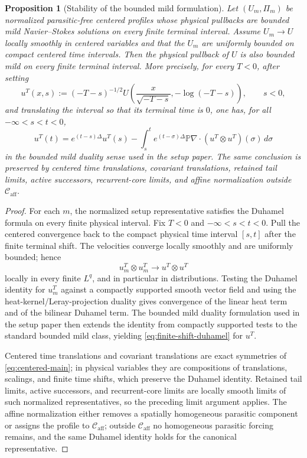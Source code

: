 \documentclass[11pt]{amsart}
\numberwithin{equation}{section}
\theoremstyle{plain}
\newtheorem{proposition}[theorem]{Proposition}
\theoremstyle{definition}
\theoremstyle{remark}
\newcommand{\Caff}{\mathcal C_{\mathrm{aff}}}
\begin{document}
\begin{proposition}[Stability of the bounded mild formulation]
\label{prop:bounded-mild-stability}
Let \((U_m,\Pi_m)\) be normalized parasitic-free centered profiles whose
physical pullbacks are bounded mild Navier--Stokes solutions on every finite
terminal interval.  Assume \(U_m\to U\) locally smoothly in centered variables
and that the \(U_m\) are uniformly bounded on compact centered time intervals.
Then the physical pullback of \(U\) is also bounded mild on every finite
terminal interval.  More precisely, for every \(T<0\), after setting
\[
   u^T(x,s):=(-T-s)^{-1/2}
   U\!\left(\frac{x}{\sqrt{-T-s}},-\log(-T-s)\right),
   \qquad s<0,
\]
and translating the interval so that its terminal time is \(0\), one has, for
all \(-\infty<s<t<0\),
\begin{equation}\label{eq:finite-shift-duhamel}
   u^T(t)=e^{(t-s)\Delta}u^T(s)
   -\int_s^t e^{(t-\sigma)\Delta}
      \mathbb P\nabla\cdot(u^T\otimes u^T)(\sigma)\,d\sigma
\end{equation}
in the bounded mild duality sense used in the setup paper.  The same conclusion is
preserved by centered time translations, covariant translations, retained tail
limits, active successors, recurrent-core limits, and affine normalization
outside \(\Caff\).
\end{proposition}

\begin{proof}
For each \(m\), the normalized setup representative satisfies the
Duhamel formula on every finite physical interval.  Fix \(T<0\) and
\(-\infty<s<t<0\).  Pull the centered convergence back to the compact physical
time interval \([s,t]\) after the finite terminal shift.  The velocities
converge locally smoothly and are uniformly bounded; hence
\[
   u_m^T\otimes u_m^T\to u^T\otimes u^T
\]
locally in every finite \(L^q\), and in particular in distributions.  Testing
the Duhamel identity for \(u_m^T\) against a compactly supported smooth vector
field and using the heat-kernel/Leray-projection duality gives convergence of
the linear heat term and of the bilinear Duhamel term.  The bounded mild
duality formulation used in the setup paper then extends the identity from
compactly supported tests to the standard bounded mild class, yielding
\eqref{eq:finite-shift-duhamel} for \(u^T\).

Centered time translations and covariant translations are exact symmetries of
\eqref{eq:centered-main}; in physical variables they are compositions of
translations, scalings, and finite time shifts, which preserve the Duhamel
identity.  Retained tail limits, active successors, and recurrent-core limits
are locally smooth limits of such normalized representatives, so the preceding
limit argument applies.  The affine normalization either removes a spatially
homogeneous parasitic component or assigns the profile to \(\Caff\); outside
\(\Caff\) no homogeneous parasitic forcing remains, and the same Duhamel
identity holds for the canonical representative.
\end{proof}
\end{document}
